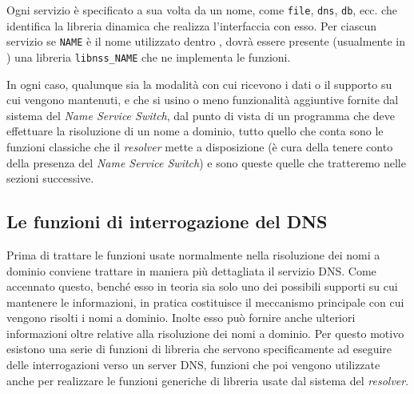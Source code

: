 Ogni servizio è specificato a sua volta da un nome, come \texttt{file},
\texttt{dns}, \texttt{db}, ecc.  che identifica la libreria dinamica che
realizza l'interfaccia con esso. Per ciascun servizio se \texttt{NAME} è il
nome utilizzato dentro , dovrà essere presente
(usualmente in ) una libreria \texttt{libnss\_NAME} che ne
implementa le funzioni.

In ogni caso, qualunque sia la modalità con cui ricevono i dati o il supporto
su cui vengono mantenuti, e che si usino o meno funzionalità aggiuntive
fornite dal sistema del \textit{Name Service Switch}, dal punto di vista di un
programma che deve effettuare la risoluzione di un nome a dominio, tutto
quello che conta sono le funzioni classiche che il \textit{resolver} mette a
disposizione (è cura della  tenere conto della presenza del
\textit{Name Service Switch}) e sono queste quelle che tratteremo nelle
sezioni successive.  



\subsection{Le funzioni di interrogazione del DNS}
\label{sec:sock_resolver_functions}

Prima di trattare le funzioni usate normalmente nella risoluzione dei nomi a
dominio conviene trattare in maniera più dettagliata il servizio DNS. Come
accennato questo, benché esso in teoria sia solo uno dei possibili supporti su
cui mantenere le informazioni, in pratica costituisce il meccanismo principale
con cui vengono risolti i nomi a dominio. Inolte esso può fornire anche
ulteriori informazioni oltre relative alla risoluzione dei nomi a dominio.
Per questo motivo esistono una serie di funzioni di libreria che servono
specificamente ad eseguire delle interrogazioni verso un server DNS, funzioni
che poi vengono utilizzate anche per realizzare le funzioni generiche di
libreria usate dal sistema del \textit{resolver}.


